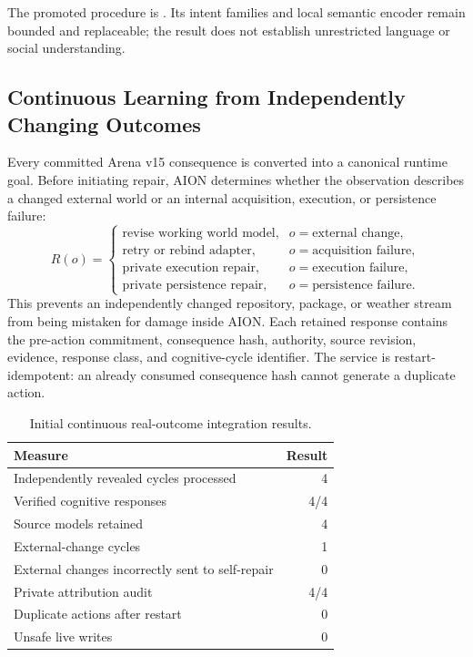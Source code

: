 The promoted procedure is
.  Its intent
families and local semantic encoder remain bounded and replaceable; the result
does not establish unrestricted language or social understanding.

\subsection{Continuous Learning from Independently Changing Outcomes}
\label{subsec:aion-continuous-real-outcomes}

Every committed Arena v15 consequence is converted into a canonical runtime
goal.  Before initiating repair, AION determines whether the observation
describes a changed external world or an internal acquisition, execution, or
persistence failure:
\begin{equation}
R(o)=
\begin{cases}
\text{revise working world model}, & o=\text{external change},\\
\text{retry or rebind adapter}, & o=\text{acquisition failure},\\
\text{private execution repair}, & o=\text{execution failure},\\
\text{private persistence repair}, & o=\text{persistence failure}.
\end{cases}
\label{eq:real-outcome-arbitration}
\end{equation}
This prevents an independently changed repository, package, or weather stream
from being mistaken for damage inside AION.  Each retained response contains
the pre-action commitment, consequence hash, authority, source revision,
evidence, response class, and cognitive-cycle identifier.  The service is
restart-idempotent: an already consumed consequence hash cannot generate a
duplicate action.

\begin{table}[htbp]
\centering
\caption{Initial continuous real-outcome integration results.}
\label{tab:aion-continuous-outcomes}
\begin{tabular}{@{}lr@{}}
\toprule
Measure & Result \\
\midrule
Independently revealed cycles processed & 4 \\
Verified cognitive responses & 4/4 \\
Source models retained & 4 \\
External-change cycles & 1 \\
External changes incorrectly sent to self-repair & 0 \\
Private attribution audit & 4/4 \\
Duplicate actions after restart & 0 \\
Unsafe live writes & 0 \\
\bottomrule
\end{tabular}
\end{table}

